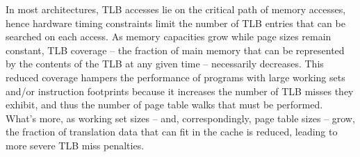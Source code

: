 In most architectures, TLB accesses lie on the critical path of memory accesses,
hence hardware timing constraints limit the number of TLB entries that can be
searched on each access.  As memory capacities grow while page sizes remain
constant, TLB coverage -- the fraction of main memory that can be represented by
the contents of the TLB at any given time -- necessarily decreases.  This reduced
coverage hampers the performance of programs with large working sets and/or
instruction footprints because it increases the number of TLB misses they
exhibit, and thus the number of page table walks that must be performed.  What's
more, as working set sizes -- and, correspondingly, page table sizes -- grow, the
fraction of translation data that can fit in the cache is reduced, leading to
more severe TLB miss penalties.

%

